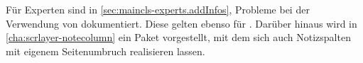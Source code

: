 Für Experten sind in
\autoref{sec:maincls-experts.addInfos},
 Probleme bei der Verwendung von
 dokumentiert. Diese gelten ebenso für .
Darüber hinaus wird in \autoref{cha:scrlayer-notecolumn} ein Paket
vorgestellt, mit dem sich auch Notizspalten mit eigenem Seitenumbruch
realisieren lassen.%
\iffalse%
  \ Allerdings ist das Paket
  \hyperref[cha:scrlayer-notecolumn]{\Package{scrlayer-notecolumn}}%
  \IndexPackage{scrlayer-notecolumn} eher als
  eine Konzeptstudie und weniger als fertiges Paket zu verstehen.%
\fi%
%
\EndIndexGroup
%
\EndIndexGroup


